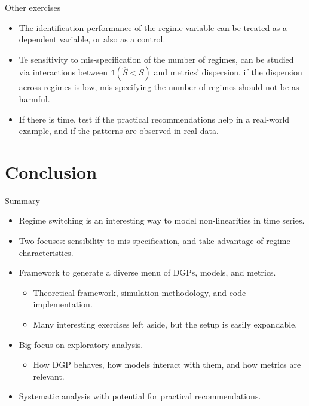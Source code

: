 \documentclass[
  ignorenonframetext,
]{beamer}
\providecommand{\tightlist}{%
  \setlength{\itemsep}{0pt}\setlength{\parskip}{0pt}}\usepackage{longtable,booktabs,array}
\begin{document}
\begin{frame}{Other exercises}
\label{other-exercises-1}
\begin{itemize}
\item
  The identification performance of the regime variable can be treated
  as a dependent variable, or also as a control.
\item
  Te sensitivity to mis-specification of the number of regimes, can be
  studied via interactions between \(\mathbb{1}(\hat{S} < S)\) and
  metrics' dispersion. if the dispersion across regimes is low,
  mis-specifying the number of regimes should not be as harmful.
\item
  If there is time, test if the practical recommendations help in a
  real-world example, and if the patterns are observed in real data.
\end{itemize}
\end{frame}

\section{Conclusion}\label{conclusion}

\begin{frame}{Summary}
\label{summary}
\begin{itemize}[<+->]
\tightlist
\item
  Regime switching is an interesting way to model non-linearities in
  time series.
\item
  Two focuses: sensibility to mis-specification, and take advantage of
  regime characteristics.
\item
  Framework to generate a diverse menu of DGPs, models, and metrics.

  \begin{itemize}[<+->]
  \tightlist
  \item
    Theoretical framework, simulation methodology, and code
    implementation.
  \item
    Many interesting exercises left aside, but the setup is easily
    expandable.
  \end{itemize}
\item
  Big focus on exploratory analysis.

  \begin{itemize}[<+->]
  \tightlist
  \item
    How DGP behaves, how models interact with them, and how metrics are
    relevant.
  \end{itemize}
\item
  Systematic analysis with potential for practical recommendations.
\end{itemize}
\end{frame}
\end{document}
